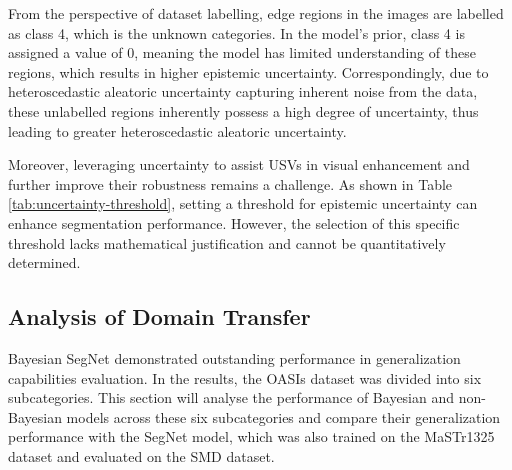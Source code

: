 From the perspective of dataset labelling, edge regions in the images are labelled as class 4, which is the unknown 
categories. In the model's prior, class 4 is assigned a value of 0, meaning the model has limited understanding of 
these regions, which results in higher epistemic uncertainty. Correspondingly, due to heteroscedastic aleatoric 
uncertainty capturing inherent noise from the data, these unlabelled regions inherently possess a high degree of 
uncertainty, thus leading to greater heteroscedastic aleatoric uncertainty.

Moreover, leveraging uncertainty to assist USVs in visual enhancement and further improve their robustness remains 
a challenge. As shown in Table \ref{tab:uncertainty-threshold}, setting a threshold for epistemic uncertainty can 
enhance segmentation performance. However, the selection of this specific threshold lacks mathematical justification 
and cannot be quantitatively determined.

\subsection{Analysis of Domain Transfer}
\label{section:ADT}
Bayesian SegNet demonstrated outstanding performance in generalization capabilities evaluation. In the results, 
the OASIs dataset was divided into six subcategories. This section will analyse the performance of Bayesian and 
non-Bayesian models across these six subcategories and compare their generalization performance with the SegNet 
model, which was also trained on the MaSTr1325 dataset and evaluated on the SMD dataset.


